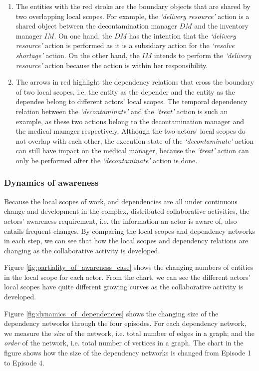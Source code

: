 \begin{enumerate}
	\item The entities with the red stroke are the boundary objects that are shared by two overlapping local scopes. For example, the \emph{`delivery resource'} action is a shared object between the decontamination manager $DM$ and the inventory manager $IM$. On one hand, the $DM$ has the intention that the \emph{`delivery resource'} action is performed as it is a subsidiary action for the \emph{`resolve shortage'} action. On the other hand, the $IM$ intends to perform the \emph{`delivery resource'} action because the action is within her responsibility. 
	\item The arrows in red highlight the dependency relations that cross the boundary of two local scopes, i.e. the entity as the depender and the entity as the dependee belong to different actors' local scopes. The temporal dependency relation between the \emph{`decontaminate'} and the \emph{`treat'} action is such an example, as these two actions belong to the decontamination manager and the medical manager respectively. Although the two actors' local scopes do not overlap with each other, the execution state of the \emph{`decontaminate'} action can still have impact on the medical manager, because the \emph{`treat'} action can only be performed after the \emph{`decontaminate'} action is done.
\end{enumerate} 

\subsubsection{Dynamics of awareness} %
\label{ssub:dynamics_of_awareness}
Because the local scopes of work, and dependencies are all under continuous change and development in the complex, distributed collaborative activities, the actors' awareness requirement, i.e. the information an actor is aware of, also entails frequent changes. By comparing the local scopes and dependency networks in each step, we can see that how the local scopes and dependency relations are changing as the collaborative activity is developed.

Figure \ref{fig:partiality_of_awareness_case} shows the changing numbers of entities in the local scope for each actor. From the chart, we can see the different actors' local scopes have quite different growing curves as the collaborative activity is developed. 

Figure \ref{fig:dynamics_of_dependencies} shows the changing size of the dependency networks through the four episodes. For each dependency network, we measure the \emph{size} of the network, i.e. total number of edges in a graph; and the \emph{order} of the network, i.e. total number of vertices in a graph. The chart in the figure shows how the size of the dependency networks is changed from Episode 1 to Episode 4.

